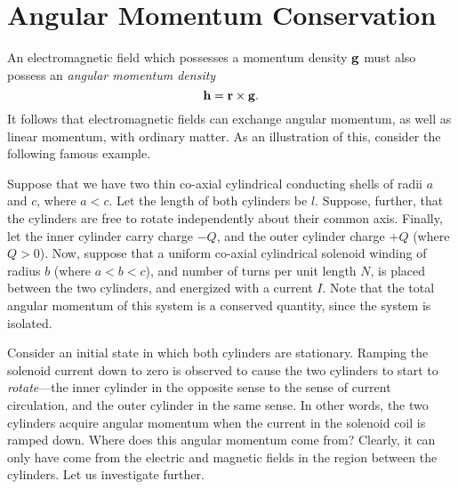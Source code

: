 \section{Angular Momentum Conservation}
An electromagnetic field which possesses a momentum density ${\bf g}$ must
also possess an {\em angular momentum density}\/
\begin{equation}\label{e8.61x}
{\bf h} = {\bf r}\times {\bf g}.
\end{equation}
It follows that electromagnetic fields can exchange angular momentum, as
well as linear momentum, with ordinary matter. As an illustration of this, consider
the following famous example. 

Suppose that we have two thin co-axial cylindrical conducting shells
of radii $a$ and $c$, where $a< c$. Let the length of both cylinders be
$l$. Suppose, further, that the cylinders are free to rotate independently about their common axis. Finally, let the inner cylinder carry charge $-Q$, and the
outer cylinder charge $+Q$ (where $Q>0$). Now, suppose that a uniform co-axial cylindrical
solenoid winding of radius $b$ (where $a<b<c$), 
and number of turns  per unit length $N$, is placed between the
two cylinders, and energized with a current $I$. Note that the total angular
momentum of this system is a conserved quantity, since the system is
isolated.

Consider an initial state in which
both cylinders are stationary. Ramping  the solenoid current down to zero is observed to cause the two cylinders to start to {\em rotate}---the inner cylinder in
the opposite sense to the sense of current circulation, and the outer cylinder in the same sense.
In other words, the two cylinders acquire angular momentum when the current in the solenoid coil is ramped down. Where does this angular
momentum come from? Clearly, it can only have come from the electric
and magnetic fields in the region between the cylinders.  Let us investigate
further.

